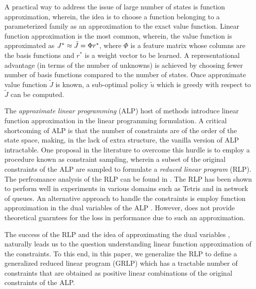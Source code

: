 A practical way to address the issue of large number of states is function approximation, wherein, the idea is to choose a function belonging to a parameterized family as an approximation to the exact value function. Linear function approximation is the most common, wherein, the value function is approximated as $J^*\approx \tilde{J}=\Phi r^*$, where $\Phi$ is a feature matrix whose columns are the basis functions and $r^*$ is a weight vector to be learned. A representational advantage (in terms of the number of unknowns) is achieved by choosing fewer number of basis functions compared to the number of states. Once approximate value function $\tilde{J}$ is known, a sub-optimal policy $\tilde{u}$ which is greedy with respect to $\tilde{J}$ can be computed.\par
The \emph{approximate linear programming} (ALP) \cite{ALP,CS,SALP,ALP-Bor,gkp,fs,npalp} host of methods introduce linear function approximation in the linear programming formulation. 
A critical shortcoming of ALP is that the number of constraints are of the order of the state space, making, in the lack of extra structure, the vanilla version of ALP intractable. One proposal in the literature to overcome this hurdle is to employ a procedure known as constraint sampling, wherein a subset of the original constraints of the ALP are sampled to formulate a \emph{reduced linear program} (RLP). The perfromance analysis of the RLP can be found in \cite{CS}. The RLP has been shown to perform well in experiments \cite{ALP,CS,CST} 
in various domains such as Tetris and in network of queues. 
An alternative approach to handle the constraints is employ function approximation in the dual variables of the ALP \cite{ALP-Bor}. However, \cite{ALP-Bor} does not provide theoretical guarntees for the loss in performance due to such an approximation.\par 
The success of the RLP \cite{CS,CST}and the idea of approximating the dual variables \cite{ALP-Bor}, naturally leads us to the question understanding linear function approximation of the constraints. To this end, in this paper, we generalize the RLP to define a generalized reduced linear program (GRLP) which has a tractable number of constraints that are obtained as positive linear combinations of the original constraints of the ALP. 
